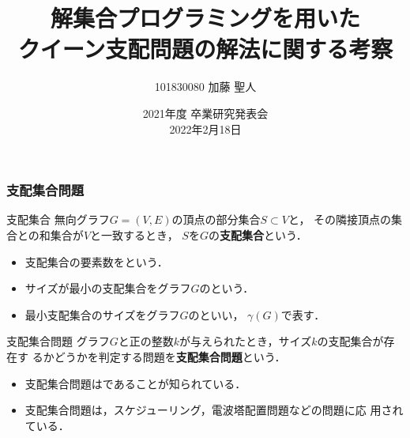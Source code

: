 \documentclass[dvipdfmx,10pt]{beamer}
\begin{document}
\title{解集合プログラミングを用いた\\クイーン支配問題の解法に関する考察}
\author{101830080 \quad 加藤 聖人}
\date{2021年度 卒業研究発表会 \\ 2022年2月18日}

%
%

\begin{frame}\frametitle{}
 \titlepage
\end{frame}

%
%

\begin{frame}\frametitle{支配集合問題}
 \begin{block}{支配集合}
無向グラフ$G=(V,E)$の頂点の部分集合$S\subset V$と，
その隣接頂点の集合との和集合が$V$と一致するとき，
$S$を$G$の\alert{\bf 支配集合}という．
\begin{itemize}
\item 支配集合の要素数をという．
\item サイズが最小の支配集合をグラフ$G$のという．
\item 最小支配集合のサイズをグラフ$G$のといい，
  $\gamma(G)$で表す．
\end{itemize}
\end{block}

\begin{block}{支配集合問題}
  グラフ$G$と正の整数$k$が与えられたとき，サイズ$k$の支配集合が存在す
  るかどうかを判定する問題を\alert{\bf 支配集合問題}という．
  \begin{itemize}
  \item 支配集合問題はであることが知られている．
  \item 支配集合問題は，スケジューリング，電波塔配置問題などの問題に応
    用されている．
  \end{itemize}
 \end{block}
\end{frame}
\end{document}

